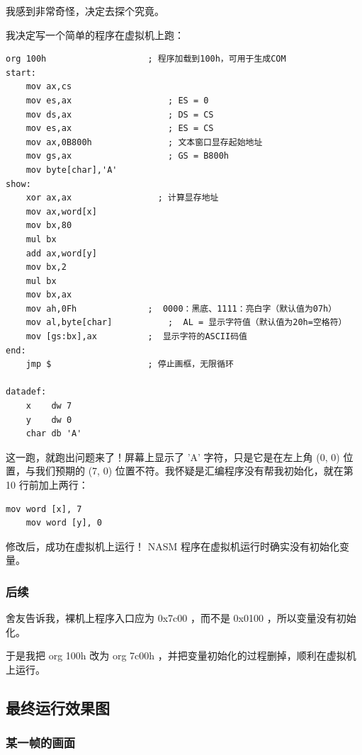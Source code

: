 \documentclass{article}
\begin{document}
我感到非常奇怪，决定去探个究竟。

我决定写一个简单的程序在虚拟机上跑：

\begin{lstlisting}[language={[x86masm]Assembler}]
    org 100h					; 程序加载到100h，可用于生成COM
start:
    mov ax,cs
	mov es,ax					; ES = 0
	mov ds,ax					; DS = CS
	mov es,ax					; ES = CS
	mov ax,0B800h				; 文本窗口显存起始地址
	mov gs,ax					; GS = B800h
    mov byte[char],'A'
show:	
    xor ax,ax                 ; 计算显存地址
    mov ax,word[x]
	mov bx,80
	mul bx
	add ax,word[y]
	mov bx,2
	mul bx
	mov bx,ax
	mov ah,0Fh				;  0000：黑底、1111：亮白字（默认值为07h）
	mov al,byte[char]			;  AL = 显示字符值（默认值为20h=空格符）
	mov [gs:bx],ax  		;  显示字符的ASCII码值
end:
    jmp $                   ; 停止画框，无限循环 
	
datadef:
    x    dw 7
    y    dw 0
    char db 'A'
\end{lstlisting}

这一跑，就跑出问题来了！屏幕上显示了 'A' 字符，只是它是在左上角 (0, 0) 位置，与我们预期的 (7, 0) 位置不符。我怀疑是汇编程序没有帮我初始化，就在第 10 行前加上两行：

\begin{lstlisting}[language={[x86masm]Assembler}]
	mov word [x], 7
	mov word [y], 0
\end{lstlisting}

修改后，成功在虚拟机上运行！ NASM 程序在虚拟机运行时确实没有初始化变量。

\subsubsection{后续}

舍友告诉我，裸机上程序入口应为 0x7c00 ，而不是 0x0100 ，所以变量没有初始化。

于是我把 org 100h 改为 org 7c00h ，并把变量初始化的过程删掉，顺利在虚拟机上运行。

\newpage

\subsection{最终运行效果图}

\subsubsection{某一帧的画面}
\end{document}
